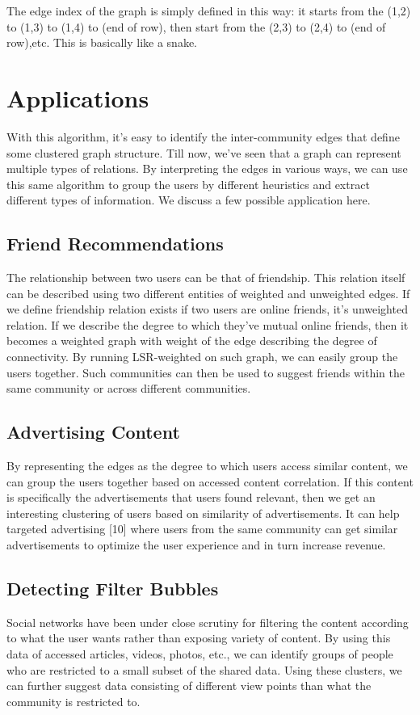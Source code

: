 \documentclass{article}
\begin{document}
The edge index of the graph is simply defined in this way: it starts from the
(1,2) to (1,3) to (1,4) to (end of row), then start from the (2,3) to (2,4) to (end of row),etc. This is basically like a snake.








\section{Applications}
With this algorithm, it's easy to identify the inter-community edges that define some clustered graph structure. Till
now, we've seen that a graph can represent multiple types of relations. By interpreting the edges in various ways, we
can use this same algorithm to group the users by different heuristics and extract different types of information. We
discuss a few possible application here.
\subsection{Friend Recommendations}
The relationship between two users can be that of friendship. This relation itself can be described using two different
entities of weighted and unweighted edges. If we define friendship relation exists if two users are online friends, it's
unweighted relation. If we describe the degree to which they've mutual online friends, then it becomes a weighted graph
with weight of the edge describing the degree of connectivity. By running LSR-weighted on such graph, we can easily
group the users together. Such communities can then be used to suggest friends within the same community or across
different communities. 

\subsection{Advertising Content}
By representing the edges as the degree to which users access similar content, we can group the users together based on
accessed content correlation. If this content is specifically the advertisements that users found relevant, then we get
an interesting clustering of users based on similarity of advertisements. It can help targeted advertising [10] where
users from the same community can get similar advertisements to optimize the user experience and in turn increase
revenue.

\subsection{Detecting Filter Bubbles}
Social networks have been under close scrutiny for filtering the content according to what the user wants rather than
exposing variety of content. By using this data of accessed articles, videos, photos, etc., we can identify groups of
people who are restricted to a small subset of the shared data. Using these clusters, we can further suggest data
consisting of different view points than what the community is restricted to.
\end{document}
